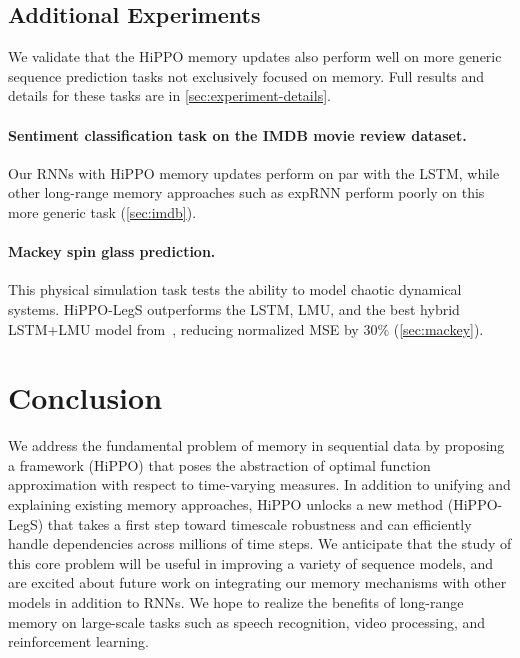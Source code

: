 \documentclass{article}
\begin{document}
\subsection{Additional Experiments}
\label{subsec:sequencetasks}

We validate that the HiPPO memory updates also perform well on more generic
sequence prediction tasks not exclusively focused on memory.
Full results and details for these tasks are in \cref{sec:experiment-details}.

\paragraph{Sentiment classification task on the IMDB movie review dataset.}
Our RNNs with HiPPO memory updates
perform on par with the LSTM, while other 
long-range memory approaches such as expRNN perform poorly on this more generic task
(\cref{sec:imdb}).


\paragraph{Mackey spin glass prediction.} This physical simulation task tests the
ability to model chaotic dynamical systems. HiPPO-LegS outperforms the LSTM,
LMU, and the best hybrid LSTM+LMU model from~\cite{voelker2019legendre},
reducing normalized MSE by $30\%$ (\cref{sec:mackey}).

 

\section{Conclusion}
\label{sec:conclusion}

We address the fundamental problem of memory in
sequential data by proposing a framework (HiPPO) that poses the abstraction
of optimal function approximation with respect to time-varying measures.
In addition to unifying and explaining existing memory approaches,
HiPPO unlocks a new method (HiPPO-LegS) that takes a first step toward timescale robustness
and can efficiently handle dependencies across millions of time steps.
We anticipate that the study of this core problem
will be useful in improving a variety of sequence models,
and are excited about future work on integrating our memory mechanisms with other models in addition to RNNs.
We hope to realize the benefits of long-range memory on large-scale tasks such
as speech recognition, video processing, and reinforcement learning.
\end{document}
